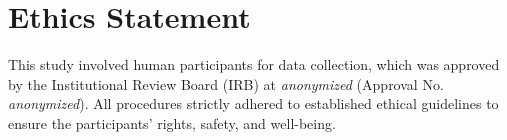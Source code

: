 \documentclass{article}
\begin{document}
\section{Ethics Statement}
This study involved human participants for data collection, which was approved by the Institutional Review Board (IRB) at \textit{anonymized} (Approval No. \textit{anonymized}). All procedures strictly adhered to established ethical guidelines to ensure the participants' rights, safety, and well-being.




%
%
%
%
\end{document}
